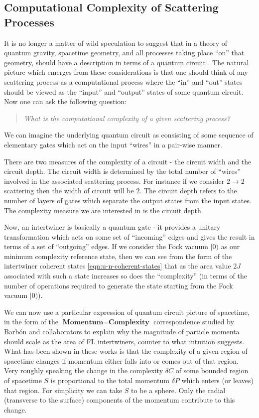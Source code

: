 \documentclass[twocolumn,final,aps,nofootinbib,nobibnotes]{revtex4-2}
\newcommand{\bket}[1]{\vert #1 )}
\begin{document}
\subsection{Computational Complexity of Scattering Processes}\label{sec:comlexity}

It is no longer a matter of wild speculation to suggest that in a theory of quantum gravity, spacetime geometry, and all processes taking place ``on'' that geometry, should have a description in terms of a quantum circuit \cite{Czech2018Einstein,Caputa2018Quantum,Takayanagi2018Holographic,Camargo2019Path}. The natural picture which emerges from these considerations is that one should think of any scattering process as a computational process where the ``in'' and ``out'' states should be viewed as the ``input'' and ``output'' states of some quantum circuit. Now one can ask the following question:
\begin{quote}
	\textit{What is the computational complexity of a given scattering process?}
\end{quote}
We can imagine the underlying quantum circuit as consisting of some sequence of elementary gates which act on the input ``wires'' in a pair-wise manner.

There are two measures of the complexity of a circuit - the circuit width and the circuit depth. The circuit width is determined by the total number of ``wires'' involved in the associated scattering process. For instance if we consider $ 2\rightarrow 2 $ scattering then the width of circuit will be $ 2 $. The circuit depth refers to the number of layers of gates which separate the output states from the input states. The complexity measure we are interested in is the circuit depth.

Now, an intertwiner is basically a quantum gate - it provides a unitary transformation which acts on some set of ``incoming'' edges and gives the result in terms of a set of ``outgoing'' edges. If we consider the Fock vacuum $ \bket{0} $ as our minimum complexity reference state, then we can see from the form of the intertwiner coherent states \eqref{eqn:u-n-coherent-states} that as the area value $ 2J $ associated with such a state increases so does the ``complexity'' (in terms of the number of operations required to generate the state starting from the Fock vacuum $ \bket{0} $).

We can now use a particular expression of quantum circuit picture of spacetime, in the form of the $ \textbf{Momentum} = \textbf{Complexity} $ correspondence studied by Barb\'on and collaborators \cite{Barbon2019Momentum/Complexity,Barbon2020Proof} to explain why the magnitude of particle momenta should scale as the area of FL intertwiners, counter to what intuition suggests. What has been shown in these works is that the complexity of a given region of spacetime changes if momentum either falls into or comes out of that region. Very roughly speaking the change in the complexity $ \delta C $ of some bounded region of spacetime $ S $ is proportional to the total momentum $ \delta P $ which enters (or leaves) that region. For simplicity we can take $ S $ to be a sphere. Only the radial (transverse to the surface) components of the momentum contribute to this change.
\end{document}
